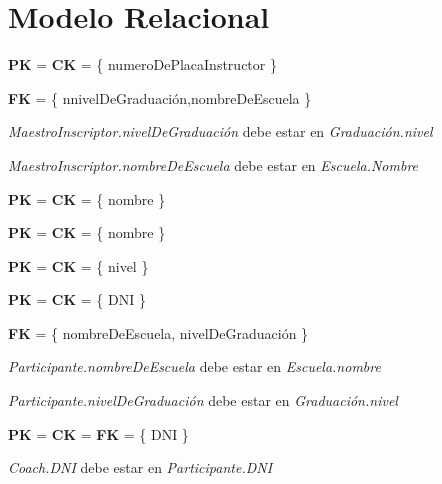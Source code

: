 \section{Modelo Relacional}


\textbf{PK} = \textbf{CK} = \{ numeroDePlacaInstructor \}

\textbf{FK} = \{ nnivelDeGraduación,nombreDeEscuela \}

\textit{MaestroInscriptor.nivelDeGraduación} debe estar en \textit{Graduación.nivel}

\textit{MaestroInscriptor.nombreDeEscuela} debe estar en \textit{Escuela.Nombre}\\


\textbf{PK} = \textbf{CK} = \{ nombre \}\\


\textbf{PK} = \textbf{CK} = \{ nombre \}\\


\textbf{PK} = \textbf{CK} = \{ nivel \}\\


\textbf{PK} = \textbf{CK} = \{ DNI \}

\textbf{FK} = \{ nombreDeEscuela, nivelDeGraduación \}

\textit{Participante.nombreDeEscuela} debe estar en \textit{Escuela.nombre}

\textit{Participante.nivelDeGraduación} debe estar en \textit{Graduación.nivel}\\


\textbf{PK} = \textbf{CK} = \textbf{FK} = \{ DNI \}

\textit{Coach.DNI} debe estar en \textit{Participante.DNI}\\


